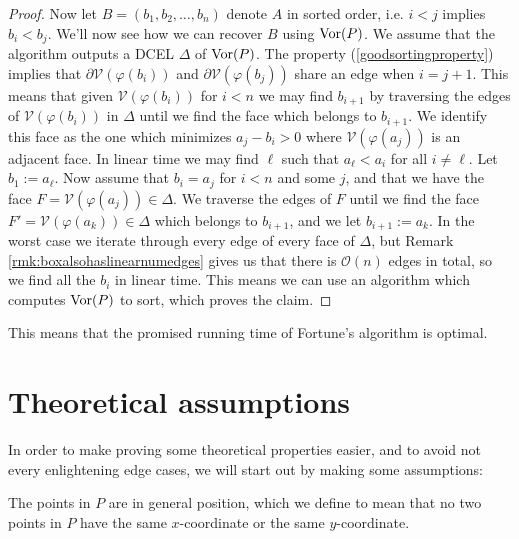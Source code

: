 \begin{proof}
Now let $B = (b_1, b_2, \ldots, b_n)$ denote $A$ in sorted order, i.e. $i < j$ implies $b_i < b_j$. We'll now see how we can recover $B$ using $\operatorname{Vor}(P)$. We assume that the algorithm outputs a DCEL $\Delta$ of $\operatorname{Vor}(P)$. The property (\ref{goodsortingproperty}) implies that $\partial \mathcal{V}(\varphi(b_i))$ and $\partial \mathcal{V}(\varphi(b_j))$ share an edge when $i = j + 1$. This means that given $\mathcal{V}(\varphi(b_i))$ for $i < n$ we may find $b_{i+1}$ by traversing the edges of $\mathcal{V}(\varphi(b_i))$ in $\Delta$ until we find the face which belongs to $b_{i+1}$. We identify this face as the one which minimizes $a_j - b_i > 0$ where $\mathcal{V}(\varphi(a_j))$ is an adjacent face. In linear time we may find $\ell$ such that $a_{\ell} < a_i$ for all $i \ne \ell$. Let $b_1 := a_{\ell}$. Now assume that $b_i = a_j$ for $i < n$ and some $j$, and that we have the face $F = \mathcal{V}(\varphi(a_j)) \in \Delta$. We traverse the edges of $F$ until we find the face $F' = \mathcal{V}(\varphi(a_k)) \in \Delta$ which belongs to $b_{i+1}$, and we let $b_{i+1} := a_k$. In the worst case we iterate through every edge of every face of $\Delta$, but Remark \ref{rmk:boxalsohaslinearnumedges} gives us that there is $\mathcal{O}(n)$ edges in total, so we find all the $b_i$ in linear time. This means we can use an algorithm which computes $\operatorname{Vor}(P)$ to sort, which proves the claim.
\end{proof}

This means that the promised running time of Fortune's algorithm is optimal.

\section{Theoretical assumptions}
In order to make proving some theoretical properties easier, and to avoid not every enlightening edge cases, we will start out by making some assumptions:

\begin{assume} \label{ass:generalposition}
The points in $P$ are in general position, which we define to mean that no two points in $P$ have the same $x$-coordinate or the same $y$-coordinate.
\end{assume}

